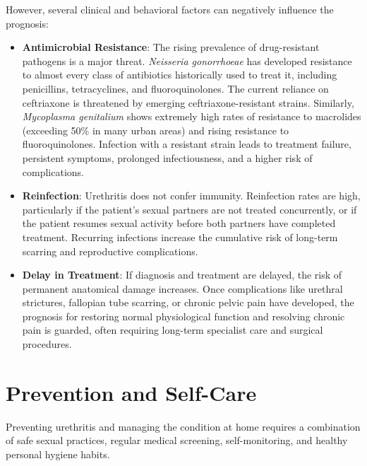 However, several clinical and behavioral factors can negatively influence the prognosis:
\begin{itemize}
    \item \textbf{Antimicrobial Resistance}: The rising prevalence of drug-resistant pathogens is a major threat. \textit{Neisseria gonorrhoeae} has developed resistance to almost every class of antibiotics historically used to treat it, including penicillins, tetracyclines, and fluoroquinolones. The current reliance on ceftriaxone is threatened by emerging ceftriaxone-resistant strains. Similarly, \textit{Mycoplasma genitalium} shows extremely high rates of resistance to macrolides (exceeding 50\% in many urban areas) and rising resistance to fluoroquinolones. Infection with a resistant strain leads to treatment failure, persistent symptoms, prolonged infectiousness, and a higher risk of complications.

    \item \textbf{Reinfection}: Urethritis does not confer immunity. Reinfection rates are high, particularly if the patient's sexual partners are not treated concurrently, or if the patient resumes sexual activity before both partners have completed treatment. Recurring infections increase the cumulative risk of long-term scarring and reproductive complications.

    \item \textbf{Delay in Treatment}: If diagnosis and treatment are delayed, the risk of permanent anatomical damage increases. Once complications like urethral strictures, fallopian tube scarring, or chronic pelvic pain have developed, the prognosis for restoring normal physiological function and resolving chronic pain is guarded, often requiring long-term specialist care and surgical procedures.
\end{itemize}

\section*{Prevention and Self-Care}
Preventing urethritis and managing the condition at home requires a combination of safe sexual practices, regular medical screening, self-monitoring, and healthy personal hygiene habits.

